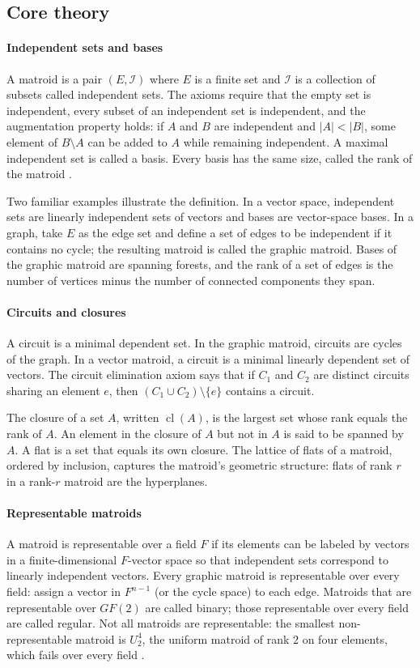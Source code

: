 \subsection*{Core theory}
\paragraph{Independent sets and bases}
A matroid is a pair $(E,\mathcal{I})$ where $E$ is a finite set and $\mathcal{I}$ is a collection of subsets called independent sets. The axioms require that the empty set is independent, every subset of an independent set is independent, and the augmentation property holds: if $A$ and $B$ are independent and $|A|<|B|$, some element of $B\setminus A$ can be added to $A$ while remaining independent. A maximal independent set is called a basis. Every basis has the same size, called the rank of the matroid \cite{matroid_theory_ref1}.

Two familiar examples illustrate the definition. In a vector space, independent sets are linearly independent sets of vectors and bases are vector-space bases. In a graph, take $E$ as the edge set and define a set of edges to be independent if it contains no cycle; the resulting matroid is called the graphic matroid. Bases of the graphic matroid are spanning forests, and the rank of a set of edges is the number of vertices minus the number of connected components they span.

\paragraph{Circuits and closures}
A circuit is a minimal dependent set. In the graphic matroid, circuits are cycles of the graph. In a vector matroid, a circuit is a minimal linearly dependent set of vectors. The circuit elimination axiom says that if $C_1$ and $C_2$ are distinct circuits sharing an element $e$, then $(C_1\cup C_2)\setminus\{e\}$ contains a circuit.

The closure of a set $A$, written $\operatorname{cl}(A)$, is the largest set whose rank equals the rank of $A$. An element in the closure of $A$ but not in $A$ is said to be spanned by $A$. A flat is a set that equals its own closure. The lattice of flats of a matroid, ordered by inclusion, captures the matroid's geometric structure: flats of rank $r$ in a rank-$r$ matroid are the hyperplanes.

\paragraph{Representable matroids}
A matroid is representable over a field $F$ if its elements can be labeled by vectors in a finite-dimensional $F$-vector space so that independent sets correspond to linearly independent vectors. Every graphic matroid is representable over every field: assign a vector in $F^{n-1}$ (or the cycle space) to each edge. Matroids that are representable over $GF(2)$ are called binary; those representable over every field are called regular. Not all matroids are representable: the smallest non-representable matroid is $U_{2}^{4}$, the uniform matroid of rank $2$ on four elements, which fails over every field \cite{matroid_theory_ref2}.

